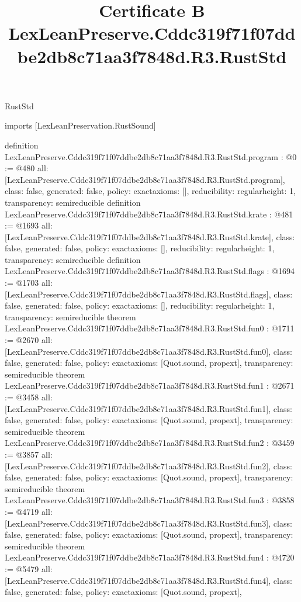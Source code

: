 \begin{lexlean}{RustStd}
\title{Certificate B LexLeanPreserve.Cddc319f71f07ddbe2db8c71aa3f7848d.R3.RustStd}
\begin{coremodule}
imports [LexLeanPreservation.RustSound]

definition LexLeanPreserve.Cddc319f71f07ddbe2db8c71aa3f7848d.R3.RustStd.program : @0 := @480 {
  all: [LexLeanPreserve.Cddc319f71f07ddbe2db8c71aa3f7848d.R3.RustStd.program],
  class: false,
  generated: false,
  policy: exact{axioms: []},
  reducibility: regular{height: 1},
  transparency: semireducible
}
definition LexLeanPreserve.Cddc319f71f07ddbe2db8c71aa3f7848d.R3.RustStd.krate : @481 := @1693 {
  all: [LexLeanPreserve.Cddc319f71f07ddbe2db8c71aa3f7848d.R3.RustStd.krate],
  class: false,
  generated: false,
  policy: exact{axioms: []},
  reducibility: regular{height: 1},
  transparency: semireducible
}
definition LexLeanPreserve.Cddc319f71f07ddbe2db8c71aa3f7848d.R3.RustStd.flags : @1694 := @1703 {
  all: [LexLeanPreserve.Cddc319f71f07ddbe2db8c71aa3f7848d.R3.RustStd.flags],
  class: false,
  generated: false,
  policy: exact{axioms: []},
  reducibility: regular{height: 1},
  transparency: semireducible
}
theorem LexLeanPreserve.Cddc319f71f07ddbe2db8c71aa3f7848d.R3.RustStd.fun0 : @1711 := @2670 {
  all: [LexLeanPreserve.Cddc319f71f07ddbe2db8c71aa3f7848d.R3.RustStd.fun0],
  class: false,
  generated: false,
  policy: exact{axioms: [Quot.sound, propext]},
  transparency: semireducible
}
theorem LexLeanPreserve.Cddc319f71f07ddbe2db8c71aa3f7848d.R3.RustStd.fun1 : @2671 := @3458 {
  all: [LexLeanPreserve.Cddc319f71f07ddbe2db8c71aa3f7848d.R3.RustStd.fun1],
  class: false,
  generated: false,
  policy: exact{axioms: [Quot.sound, propext]},
  transparency: semireducible
}
theorem LexLeanPreserve.Cddc319f71f07ddbe2db8c71aa3f7848d.R3.RustStd.fun2 : @3459 := @3857 {
  all: [LexLeanPreserve.Cddc319f71f07ddbe2db8c71aa3f7848d.R3.RustStd.fun2],
  class: false,
  generated: false,
  policy: exact{axioms: [Quot.sound, propext]},
  transparency: semireducible
}
theorem LexLeanPreserve.Cddc319f71f07ddbe2db8c71aa3f7848d.R3.RustStd.fun3 : @3858 := @4719 {
  all: [LexLeanPreserve.Cddc319f71f07ddbe2db8c71aa3f7848d.R3.RustStd.fun3],
  class: false,
  generated: false,
  policy: exact{axioms: [Quot.sound, propext]},
  transparency: semireducible
}
theorem LexLeanPreserve.Cddc319f71f07ddbe2db8c71aa3f7848d.R3.RustStd.fun4 : @4720 := @5479 {
  all: [LexLeanPreserve.Cddc319f71f07ddbe2db8c71aa3f7848d.R3.RustStd.fun4],
  class: false,
  generated: false,
  policy: exact{axioms: [Quot.sound, propext]},
}
\end{coremodule}
\end{lexlean}
